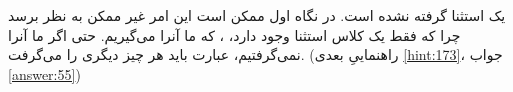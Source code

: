 \section{}
\paragraph{}\label{hint:110}
یک استثنا گرفته نشده است. در نگاه اول ممکن است این امر غیر ممکن به نظر برسد چرا که فقط یک کلاس استثنا وجود دارد، ، که ما آنرا می‌گیریم. حتی اگر ما آنرا نمی‌گرفتیم، عبارت  باید هر چیز دیگری را می‌گرفت. (راهنماییِ بعدی \ref{hint:173}، جواب \ref{answer:55})